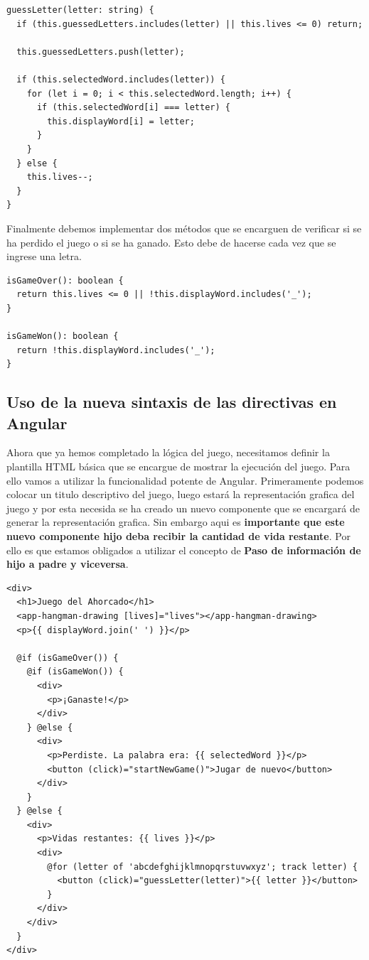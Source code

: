 \documentclass[10pt, a4paper]{article}
\begin{document}
\begin{verbatim}
guessLetter(letter: string) {
  if (this.guessedLetters.includes(letter) || this.lives <= 0) return;

  this.guessedLetters.push(letter);

  if (this.selectedWord.includes(letter)) {
    for (let i = 0; i < this.selectedWord.length; i++) {
      if (this.selectedWord[i] === letter) {
        this.displayWord[i] = letter;
      }
    }
  } else {
    this.lives--;
  }
}
\end{verbatim}

Finalmente debemos implementar dos métodos que se encarguen de verificar si se ha perdido el juego o si se ha ganado. Esto debe de hacerse cada vez que se ingrese una letra.

\begin{verbatim}
isGameOver(): boolean {
  return this.lives <= 0 || !this.displayWord.includes('_');
}

isGameWon(): boolean {
  return !this.displayWord.includes('_');
}
\end{verbatim}

\subsection{Uso de la nueva sintaxis de las directivas en Angular}
Ahora que ya hemos completado la lógica del juego, necesitamos definir la plantilla HTML básica que se encargue de mostrar la ejecución del juego.
\singlespacing
Para ello vamos a utilizar la funcionalidad potente de Angular. Primeramente podemos colocar un titulo descriptivo del juego, luego estará la representación grafica del juego y por esta necesida se ha creado un nuevo componente que se encargará de generar la representación grafica. 
\singlespacing
Sin embargo aqui es \textbf{importante que este nuevo componente hijo deba recibir la cantidad de vida restante}. Por ello es que estamos obligados a utilizar el concepto de \textbf{Paso de información de hijo a padre y viceversa}.

\begin{verbatim}
<div>
  <h1>Juego del Ahorcado</h1>
  <app-hangman-drawing [lives]="lives"></app-hangman-drawing>
  <p>{{ displayWord.join(' ') }}</p>

  @if (isGameOver()) {
    @if (isGameWon()) {
      <div>
        <p>¡Ganaste!</p>
      </div>
    } @else {
      <div>
        <p>Perdiste. La palabra era: {{ selectedWord }}</p>
        <button (click)="startNewGame()">Jugar de nuevo</button>
      </div>
    }
  } @else {
    <div>
      <p>Vidas restantes: {{ lives }}</p>
      <div>
        @for (letter of 'abcdefghijklmnopqrstuvwxyz'; track letter) {
          <button (click)="guessLetter(letter)">{{ letter }}</button>
        }
      </div>
    </div>
  }
</div>
\end{verbatim}
\end{document}
